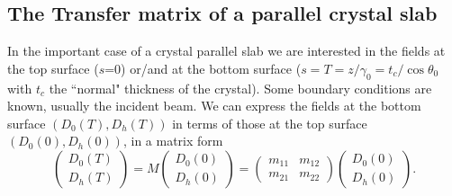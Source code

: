 \documentclass[preprint]{iucr}              %
\begin{document}
\subsection{The Transfer matrix of a parallel crystal slab}
\label{sec:transferMatrix}

In the important case of a crystal parallel slab we are interested in the fields at the top surface ($s$=0) or/and at the bottom surface ($s=T=z/\gamma_0=t_c/\cos\theta_0$ with $t_c$ the ``normal" thickness of the crystal). Some boundary conditions are known, usually the incident beam.   
We can express the fields at the bottom surface $(D_0(T),D_h(T))$ in terms of those at the top surface $(D_0(0),D_h(0))$, in a matrix form
\begin{equation}\label{eq:Mtransfer}
    \begin{pmatrix}
    D_0(T)\\
    D_h(T)
    \end{pmatrix}
    =
    M
        \begin{pmatrix}
    D_0(0) \\
    D_h(0)
    \end{pmatrix}
    =
    \begin{pmatrix}
    m_{11} & m_{12}\\
    m_{21} & m_{22}
    \end{pmatrix}
    \begin{pmatrix}
    D_0(0) \\
    D_h(0)
    \end{pmatrix}.
\end{equation}


\end{document}

